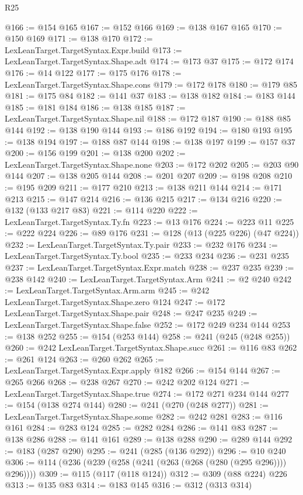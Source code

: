 \begin{lexlean}{R25}
\begin{coremodule}
@166 := @154 @165
@167 := @152 @166
@169 := @138 @167 @165
@170 := @150 @169
@171 := @138 @170
@172 := LexLeanTarget.TargetSyntax.Expr.build
@173 := LexLeanTarget.TargetSyntax.Shape.adt
@174 := @173 @37
@175 := @172 @174
@176 := @14 @122
@177 := @175 @176
@178 := LexLeanTarget.TargetSyntax.Shape.cons
@179 := @172 @178
@180 := @179 @85
@181 := @175 @84
@182 := @141 @37
@183 := @138 @182
@184 := @183 @144
@185 := @181 @184
@186 := @138 @185
@187 := LexLeanTarget.TargetSyntax.Shape.nil
@188 := @172 @187
@190 := @188 @85 @144
@192 := @138 @190 @144
@193 := @186 @192
@194 := @180 @193
@195 := @138 @194
@197 := @188 @87 @144
@198 := @138 @197
@199 := @157 @37
@200 := @156 @199
@201 := @138 @200
@202 := LexLeanTarget.TargetSyntax.Shape.none
@203 := @172 @202
@205 := @203 @90 @144
@207 := @138 @205 @144
@208 := @201 @207
@209 := @198 @208
@210 := @195 @209
@211 := @177 @210
@213 := @138 @211 @144
@214 := @171 @213
@215 := @147 @214
@216 := @136 @215
@217 := @134 @216
@220 := @132 (@133 @217 @83)
@221 := @114 @220
@222 := LexLeanTarget.TargetSyntax.Ty.fn
@223 := @13 @176
@224 := @223 @11
@225 := @222 @224
@226 := @89 @176
@231 := @128 (@13 (@225 @226) (@47 @224))
@232 := LexLeanTarget.TargetSyntax.Ty.pair
@233 := @232 @176
@234 := LexLeanTarget.TargetSyntax.Ty.bool
@235 := @233 @234
@236 := @231 @235
@237 := LexLeanTarget.TargetSyntax.Expr.match
@238 := @237 @235
@239 := @238 @142
@240 := LexLeanTarget.TargetSyntax.Arm
@241 := @2 @240
@242 := LexLeanTarget.TargetSyntax.Arm.arm
@245 := @242 LexLeanTarget.TargetSyntax.Shape.zero @124
@247 := @172 LexLeanTarget.TargetSyntax.Shape.pair
@248 := @247 @235
@249 := LexLeanTarget.TargetSyntax.Shape.false
@252 := @172 @249 @234 @144
@253 := @138 @252
@255 := @154 (@253 @144)
@258 := @241 (@245 (@248 @255))
@260 := @242 LexLeanTarget.TargetSyntax.Shape.succ
@261 := @116 @83
@262 := @261 @124
@263 := @260 @262
@265 := LexLeanTarget.TargetSyntax.Expr.apply @182
@266 := @154 @144
@267 := @265 @266
@268 := @238 @267
@270 := @242 @202 @124
@271 := LexLeanTarget.TargetSyntax.Shape.true
@274 := @172 @271 @234 @144
@277 := @154 (@138 @274 @144)
@280 := @241 (@270 (@248 @277))
@281 := LexLeanTarget.TargetSyntax.Shape.some
@282 := @242 @281
@283 := @116 @161
@284 := @283 @124
@285 := @282 @284
@286 := @141 @83
@287 := @138 @286
@288 := @141 @161
@289 := @138 @288
@290 := @289 @144
@292 := @183 (@287 @290)
@295 := @241 (@285 (@136 @292))
@296 := @10 @240
@306 := @114 (@236 (@239 (@258 (@241 (@263 (@268 (@280 (@295 @296)))) @296))))
@309 := @115 (@117 (@118 @124))
@312 := @309 (@88 @224) @226
@313 := @135 @83
@314 := @183 @145
@316 := @312 (@313 @314)

\end{coremodule}
\end{lexlean}
